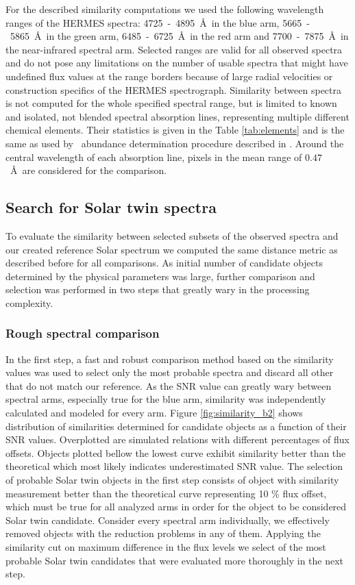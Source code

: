 For the described similarity computations we used the following wavelength ranges of the HERMES spectra: 4725~-~4895~\AA\ in the blue arm, 5665~-~5865~\AA\ in the green arm, 6485~-~6725~\AA\ in the red arm and 7700~-~7875~\AA\ in the near-infrared spectral arm. Selected ranges are valid for all observed spectra and do not pose any limitations on the number of usable spectra that might have undefined flux values at the range borders because of large radial velocities or construction specifics of the HERMES spectrograph. Similarity between spectra is not computed for the whole specified spectral range, but is limited to known and isolated, not blended spectral absorption lines, representing multiple different chemical elements. Their statistics is given in the Table \ref{tab:elements} and is the same as used by \TC\ abundance determination procedure described in \cite{buder2018}. Around the central wavelength of each absorption line, pixels in the mean range of $0.47$~\AA\ are considered for the comparison.

\subsection{Search for Solar twin spectra}
To evaluate the similarity between selected subsets of the observed spectra and our created reference Solar spectrum we computed the same distance metric as described before for all comparisons. As initial number of candidate objects determined by the physical parameters was large, further comparison and selection was performed in two steps that greatly wary in the processing complexity.

\subsubsection{Rough spectral comparison}
In the first step, a fast and robust comparison method based on the similarity values was used to select only the most probable spectra and discard all other that do not match our reference. As the SNR value can greatly wary between spectral arms, especially true for the blue arm, similarity was independently calculated and modeled for every arm. Figure \ref{fig:similarity_b2} shows distribution of similarities determined for candidate objects as a function of their SNR values. Overplotted are simulated relations with different percentages of flux offsets. Objects plotted bellow the lowest curve exhibit similarity better than the theoretical which most likely indicates underestimated SNR value. The selection of probable Solar twin objects in the first step consists of object with similarity measurement better than the theoretical curve representing 10 \% flux offset, which must be true for all analyzed arms in order for the object to be considered Solar twin candidate. Consider every spectral arm individually, we effectively removed objects with the reduction problems in any of them. Applying the similarity cut on maximum difference in the flux levels we select  of the most probable Solar twin candidates that were evaluated more thoroughly in the next step.

